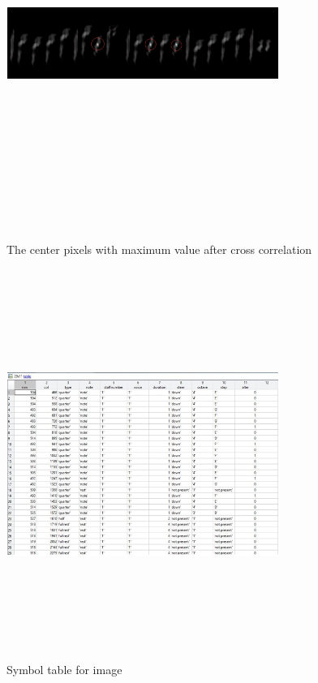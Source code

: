 \documentclass[journal]{IEEEtran}
\begin{document}
\begin{figure}
\includegraphics[width=3.5in,height=5.0in,clip,keepaspectratio]{resources/results/matched_symbols}
\centering
\caption{The center pixels with maximum value after cross correlation}
\end{figure}

\begin{figure}
\includegraphics[width=3.5in,height=5.0in,clip,keepaspectratio]{resources/results/symbol_table}
\centering
\caption{Symbol table for image}
\end{figure}
\end{document}
